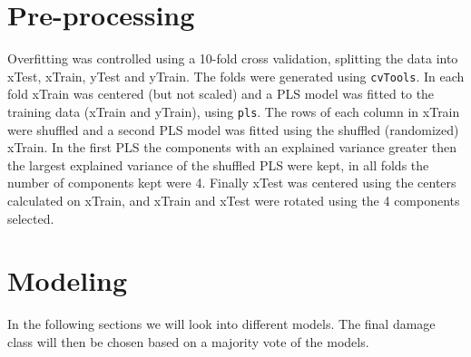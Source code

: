 \documentclass[a4paper,draft=false]{scrreprt}\usepackage[]{graphicx}\usepackage[]{color}
\begin{document}
{\let\clearpage\relax \chapter{Pre-processing}}
Overfitting was controlled using a 10-fold cross validation, splitting the data into xTest, xTrain, yTest and yTrain. The folds were generated using \verb+cvTools+\cite{cvTools}. In each fold xTrain was centered (but not scaled) and a PLS model was fitted to the training data (xTrain and yTrain), using \verb+pls+\cite{pls}. The rows of each column in xTrain were shuffled and a second PLS model was fitted using the shuffled (randomized) xTrain. In the first PLS the components with an explained variance greater then the largest explained variance of the shuffled PLS were kept, in all folds the number of components kept were 4. Finally xTest was centered using the centers calculated on xTrain, and xTrain and xTest were rotated using the 4 components selected. 

{\let\clearpage\relax \chapter{Modeling}}


In the following sections we will look into different models. The final damage class will then be chosen based on a majority vote of the models.
\end{document}
